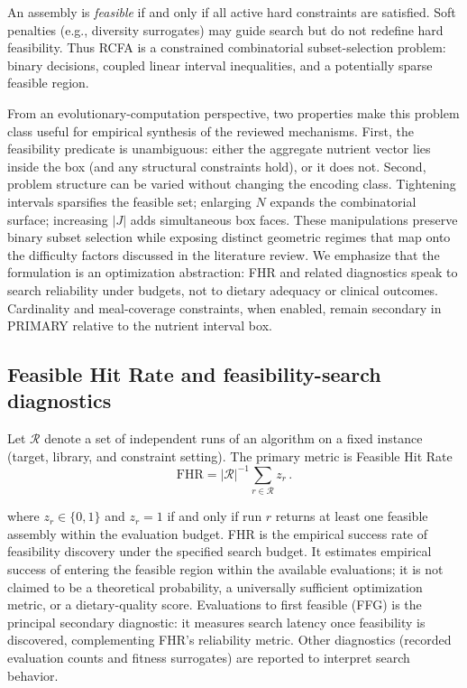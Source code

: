 \documentclass[lettersize,journal]{IEEEtran}
\begin{document}
\vspace{6pt}
\noindent
An assembly is \emph{feasible} if and only if all active hard constraints are satisfied.
Soft penalties (e.g., diversity surrogates) may guide search but do not redefine hard feasibility.
Thus RCFA is a constrained combinatorial subset-selection problem: binary decisions, coupled linear interval inequalities, and a potentially sparse feasible region.

From an evolutionary-computation perspective, two properties make this problem class useful for empirical synthesis of the reviewed mechanisms.
First, the feasibility predicate is unambiguous: either the aggregate nutrient vector lies inside the box (and any structural constraints hold), or it does not.
Second, problem structure can be varied without changing the encoding class.
Tightening intervals sparsifies the feasible set; enlarging $N$ expands the combinatorial surface; increasing $|J|$ adds simultaneous box faces.
These manipulations preserve binary subset selection while exposing distinct geometric regimes that map onto the difficulty factors discussed in the literature review.
We emphasize that the formulation is an optimization abstraction: FHR and related diagnostics speak to search reliability under budgets, not to dietary adequacy or clinical outcomes.
Cardinality and meal-coverage constraints, when enabled, remain secondary in PRIMARY relative to the nutrient interval box.

\subsection{Feasible Hit Rate and feasibility-search diagnostics}
Let $\mathcal{R}$ denote a set of independent runs of an algorithm on a fixed instance (target, library, and constraint setting).
The primary metric is Feasible Hit Rate\hspace{\fill}
\begin{equation}
\textstyle
\mathrm{FHR}
=
|\mathcal{R}|^{-1}
\sum_{r\in\mathcal{R}}
z_r\,.
\label{eq:fhr}
\end{equation}

\vspace{6pt}
\noindent
where $z_r\in\{0,1\}$ and $z_r=1$ if and only if run $r$ returns at least one feasible assembly within the evaluation budget.
FHR is the empirical success rate of feasibility discovery under the specified search budget.
It estimates empirical success of entering the feasible region within the available evaluations; it is not claimed to be a theoretical probability, a universally sufficient optimization metric, or a dietary-quality score.
Evaluations to first feasible (FFG) is the principal secondary diagnostic: it measures search latency once feasibility is discovered, complementing FHR's reliability metric.
Other diagnostics (recorded evaluation counts and fitness surrogates) are reported to interpret search behavior.
\end{document}
